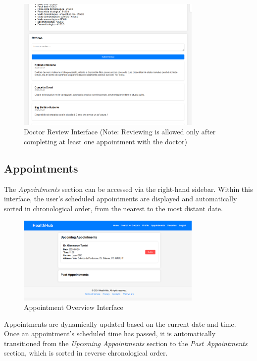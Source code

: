 \begin{figure}[H]
	\centering
	\includegraphics[width=0.8\textwidth]{resources/screenshots/patient_ui/review-doctor.png}
	\caption{Doctor Review Interface (Note: Reviewing is allowed only after completing at least one appointment with the doctor)}
	\label{fig:review-doctor}
\end{figure}

\subsection{Appointments}
The \textit{Appointments} section can be accessed via the right-hand sidebar. Within this interface, the user's scheduled appointments are displayed and automatically sorted in chronological order, from the nearest to the most distant date. 

\begin{figure}[H]
	\centering
	\includegraphics[width=0.8\textwidth]{resources/screenshots/patient_ui/patient-appointment.png}
	\caption{Appointment Overview Interface}
	\label{fig:patient-appointment}
\end{figure}

Appointments are dynamically updated based on the current date and time. Once an appointment's scheduled time has passed, it is automatically transitioned from the \textit{Upcoming Appointments} section to the \textit{Past Appointments} section, which is sorted in reverse chronological order.


